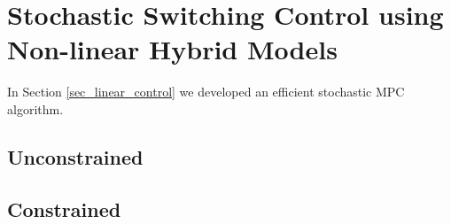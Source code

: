 \section{Stochastic Switching Control using Non-linear Hybrid Models}
In Section \ref{sec_linear_control} we developed an efficient stochastic MPC algorithm. 


\subsection{Unconstrained}

\subsection{Constrained} 

